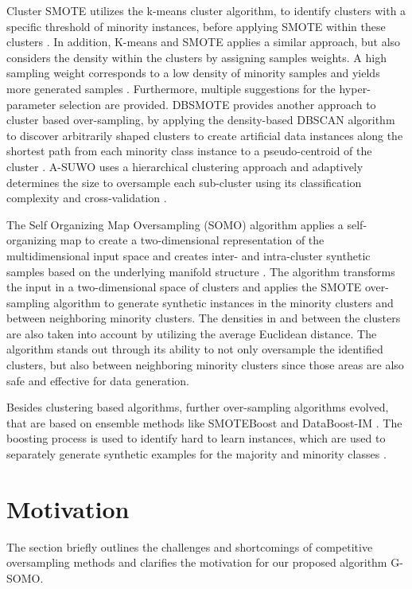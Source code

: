 \documentclass[parskip=full]{scrartcl}
\begin{document}
Cluster SMOTE utilizes the k-means cluster algorithm, to identify clusters with
a specific threshold of minority instances, before applying SMOTE within these
clusters \cite{CieslakCS06}. In addition, K-means and SMOTE applies a similar
approach, but also considers the density within the clusters by assigning
samples weights. A high sampling weight corresponds to a low density of minority
samples and yields more generated samples \cite{Last2017}. Furthermore, multiple
suggestions for the hyper-parameter selection are provided. DBSMOTE provides
another approach to cluster based over-sampling, by applying the density-based
DBSCAN algorithm to discover arbitrarily shaped clusters to create artificial
data instances along the shortest path from each minority class instance to a
pseudo-centroid of the cluster \cite{Bunkhumpornpat2011}. A-SUWO uses a
hierarchical clustering approach and adaptively determines the size to
oversample each sub-cluster using its classification complexity and
cross-validation \cite{Nekooeimehr2015}. 

The Self Organizing Map Oversampling (SOMO) algorithm applies a self-organizing
map to create a two-dimensional representation of the multidimensional input
space and creates inter- and intra-cluster synthetic samples based on the
underlying manifold structure \cite{Douzas2017B}. The algorithm transforms the
input in a two-dimensional space of clusters and applies the SMOTE over-sampling
algorithm to generate synthetic instances in the minority clusters and between
neighboring minority clusters. The densities in and between the clusters are
also taken into account by utilizing the average Euclidean distance. The
algorithm stands out through its ability to not only oversample the identified
clusters, but also between neighboring minority clusters since those areas are
also safe and effective for data generation.  

Besides clustering based algorithms, further over-sampling algorithms evolved,
that are based on ensemble methods like SMOTEBoost \cite{Chawla2003} and
DataBoost-IM \cite{Guo2004}. The boosting process is used to identify hard to
learn instances, which are used to separately generate synthetic examples for
the majority and minority classes  \cite{Guo2004}.

\section{Motivation}

The section briefly outlines the challenges and shortcomings of competitive
oversampling methods and clarifies the motivation for our proposed algorithm
G-SOMO.
\end{document}
